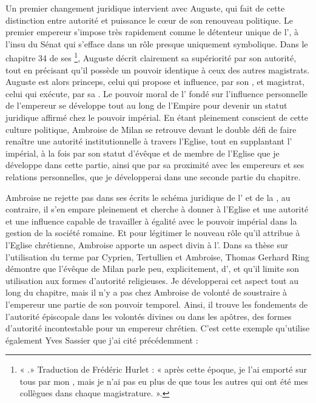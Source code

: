 Un premier changement juridique intervient avec Auguste, qui fait de cette distinction entre autorité et puissance le cœur de son renouveau politique. Le premier empereur s’impose très rapidement comme le détenteur unique de l’, à l’insu du Sénat qui s’efface dans un rôle presque uniquement symbolique. Dans le chapitre 34 de ses \footnote{« .» {Traduction de Frédéric Hurlet : « après cette époque, je l’ai emporté sur tous par mon , mais je n’ai pas eu plus de  que tous les autres qui ont été mes collègues dans chaque magistrature. »}.}, Auguste décrit clairement sa supériorité par son autorité, tout en précisant qu’il possède un pouvoir identique à ceux des autres magistrats. Auguste est alors princeps, celui qui propose et influence, par son , et magistrat, celui qui exécute, par sa \autocite{magdelain_auctoritas}. Le pouvoir moral de l' fondé sur l’influence personnelle de l’empereur se développe tout au long de l’Empire pour devenir un statut juridique affirmé chez le pouvoir impérial. En étant pleinement conscient de cette culture politique, Ambroise de Milan se retrouve devant le double défi de faire renaître une autorité institutionnelle à travers l’Eglise, tout en supplantant l’ impérial, à la fois par son statut d’évêque et de membre de l’Eglise que je développe dans cette partie, ainsi que par sa proximité avec les empereurs et ses relations personnelles, que je développerai dans une seconde partie du chapitre.

\bigskip

Ambroise ne rejette pas dans ses écrits le schéma juridique de l’ et de la , au contraire, il s’en empare pleinement et cherche à donner à l’Eglise et une autorité et une influence capable de travailler à égalité avec le pouvoir impérial dans la gestion de la société romaine. Et pour légitimer le nouveau rôle qu’il attribue à l’Eglise chrétienne, Ambroise apporte un aspect divin à l’. Dans sa thèse sur l’utilisation du terme  par Cyprien, Tertullien et Ambroise\autocite{ring_auctoritas}, Thomas Gerhard Ring démontre que l’évêque de Milan parle peu, explicitement, d’, et qu’il limite son utilisation aux formes d’autorité religieuses. Je développerai cet aspect tout au long du chapitre, mais il n’y a pas chez Ambroise de volonté de soustraire à l’empereur une partie de son pouvoir temporel. Ainsi, il trouve les fondements de l’autorité épiscopale dans les volontés divines ou dans les apôtres, des formes d’autorité incontestable pour un empereur chrétien. C’est cette exemple qu’utilise également Yves Sassier que j’ai cité précédemment :

